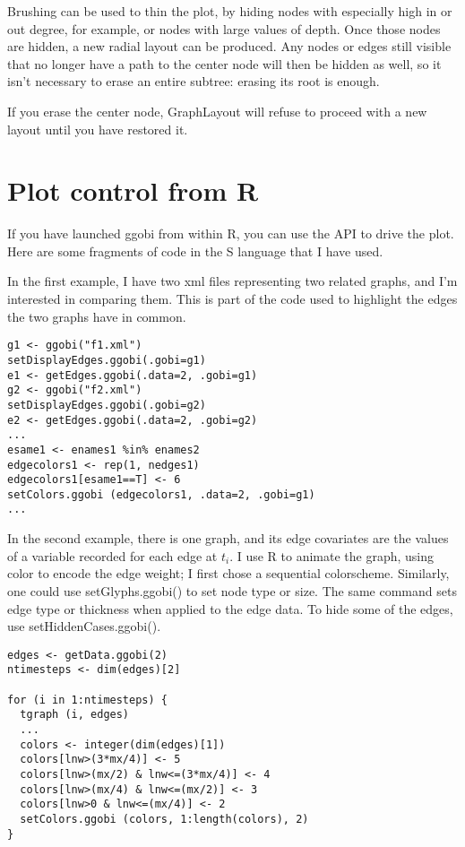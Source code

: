 \documentclass[11pt]{article}
\begin{document}
Brushing can be used to thin the plot, by hiding nodes with especially
high in or out degree, for example, or nodes with large values of depth.
Once those nodes are hidden, a new radial layout can be produced.
Any nodes or edges still visible that no longer have a path to the
center node will then be hidden as well, so it isn't necessary to erase
an entire subtree: erasing its root is enough.

If you erase the center node, GraphLayout will refuse to proceed with
a new layout until you have restored it.

\section{Plot control from R}

If you have launched ggobi from within R, you can use the API to
drive the plot.  Here are some fragments of code in the S language
that I have used.

In the first example, I have two xml files representing two
related graphs, and I'm interested in comparing them.  This is
part of the code used to highlight the edges the two graphs
have in common.

\begin{verbatim}
g1 <- ggobi("f1.xml")
setDisplayEdges.ggobi(.gobi=g1)
e1 <- getEdges.ggobi(.data=2, .gobi=g1)
g2 <- ggobi("f2.xml")
setDisplayEdges.ggobi(.gobi=g2)
e2 <- getEdges.ggobi(.data=2, .gobi=g2)
...
esame1 <- enames1 %in% enames2
edgecolors1 <- rep(1, nedges1)
edgecolors1[esame1==T] <- 6
setColors.ggobi (edgecolors1, .data=2, .gobi=g1)
...
\end{verbatim}


In the second example, there is one graph, and its edge covariates are
the values of a variable recorded for each edge at $t_i$.  I use R to
animate the graph, using color to encode the edge weight; I first chose
a sequential colorscheme.  Similarly, one could use setGlyphs.ggobi() to
set node type or size.  The same command sets edge type or thickness
when applied to the edge data.  To hide some of the edges, use
setHiddenCases.ggobi().

\begin{verbatim}
edges <- getData.ggobi(2)
ntimesteps <- dim(edges)[2]

for (i in 1:ntimesteps) {
  tgraph (i, edges)
  ...
  colors <- integer(dim(edges)[1])
  colors[lnw>(3*mx/4)] <- 5
  colors[lnw>(mx/2) & lnw<=(3*mx/4)] <- 4
  colors[lnw>(mx/4) & lnw<=(mx/2)] <- 3
  colors[lnw>0 & lnw<=(mx/4)] <- 2
  setColors.ggobi (colors, 1:length(colors), 2)
}
\end{verbatim}
\end{document}
